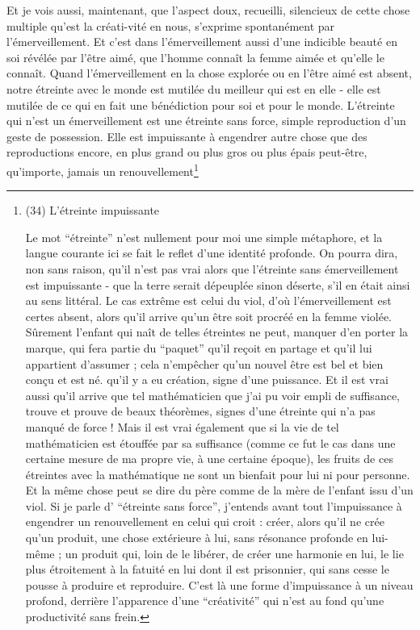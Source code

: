 Et je vois aussi, maintenant, que l'aspect doux, recueilli, silencieux de cette chose multiple qu'est la créati-vité en nous, s'exprime spontanément par l'émerveillement. Et c'est dans l'émerveillement aussi d'une indicible beauté en soi révélée par l'être aimé, que l'homme connaît la femme aimée et qu'elle le connaît. Quand l'émerveillement en la chose explorée ou en l'être aimé est absent, notre étreinte avec le monde est mutilée du meilleur qui est en elle - elle est mutilée de ce qui en fait une bénédiction pour soi et pour le monde. L'étreinte qui n'est un émerveillement est une étreinte sans force, simple reproduction d'un geste de possession. Elle est impuissante à engendrer autre chose que des reproductions encore, en plus grand ou plus gros ou plus épais peut-être, qu'importe, jamais un renouvellement\footnote{(34) L'étreinte impuissante

Le mot ``étreinte'' n'est nullement pour moi une simple métaphore, et la langue courante ici se fait le reflet d'une identité profonde. On pourra dira, non sans raison, qu'il n'est pas vrai alors que l'étreinte sans émerveillement est impuissante - que la terre serait dépeuplée sinon déserte, s'il en était ainsi au sens littéral. Le cas extrême est celui du viol, d'où l'émerveillement est certes absent, alors qu'il arrive qu'un être soit procréé en la femme violée. Sûrement l'enfant qui naît de telles étreintes ne peut, manquer d'en porter la marque, qui fera partie du ``paquet'' qu'il reçoit en partage et qu'il lui appartient d'assumer ; cela n'empêcher qu'un nouvel être est bel et bien conçu et est né. qu'il y a eu création, signe d'une puissance. Et il est vrai aussi qu'il arrive que tel mathématicien que j'ai pu voir empli de suffisance, trouve et prouve de beaux théorèmes, signes d'une étreinte qui n'a pas manqué de force ! Mais il est vrai également que si la vie de tel mathématicien est étouffée par sa suffisance (comme ce fut le cas dans une certaine mesure de ma propre vie, à une certaine époque), les fruits de ces étreintes avec la mathématique ne sont un bienfait pour lui ni pour personne. Et la même chose peut se dire du père comme de la mère de l'enfant issu d'un viol. Si je parle d' ``étreinte sans force'', j'entends avant tout l'impuissance à engendrer un renouvellement en celui qui croit : créer, alors qu'il ne crée qu'un produit, une chose extérieure à lui, sans résonance profonde en lui-même ; un produit qui, loin de le libérer, de créer une harmonie en lui, le lie plus étroitement à la fatuité en lui dont il est prisonnier, qui sans cesse le pousse à produire et reproduire. C'est là une forme d'impuissance à un niveau profond, derrière l'apparence d'une ``créativité'' qui n'est au fond qu'une productivité sans frein.

}
